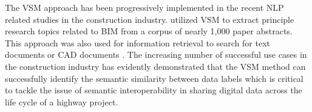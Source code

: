 \documentclass[Journal, BackFigs, DoubleSpace]{ascelike}%
\begin{document}
\par
The VSM approach has been progressively implemented in the recent NLP related studies in the construction industry.  utilized VSM to extract principle research topics related to BIM from a corpus of nearly 1,000 paper abstracts. This approach was also used for information retrieval to search for text documents \cite{lv15} or CAD documents \cite{hsu13}. The increasing number of successful use cases in the construction industry has evidently demonstrated that the VSM method can successfully identify the semantic similarity between data labels which is critical to tackle the issue of semantic interoperability in sharing digital data across the life cycle of a highway project.
%
\end{document}
